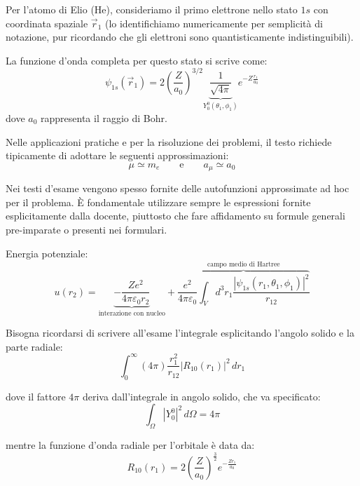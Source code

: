 \begin{exercise}
    Per l'atomo di Elio (He), consideriamo il primo elettrone nello stato \( 1s \) con coordinata spaziale \( \vec{r}_1 \) (lo identifichiamo numericamente per semplicità di notazione, pur ricordando che gli elettroni sono quantisticamente indistinguibili).

    La funzione d'onda completa per questo stato si scrive come:
    \begin{equation}
        \psi_{1s}(\vec{r}_1) = 2 \left( \frac{Z}{a_0} \right)^{3/2} \underbrace{\frac{1}{\sqrt{4\pi}}}_{Y_0^0(\theta_1, \phi_1)} e^{-Z \frac{r_1}{a_0}}
    \end{equation}
    dove \( a_0 \) rappresenta il raggio di Bohr.

    Nelle applicazioni pratiche e per la risoluzione dei problemi, il testo richiede tipicamente di adottare le seguenti approssimazioni:
    \begin{equation}
        \mu \simeq m_e \qquad \text{e} \qquad a_\mu \simeq a_0
    \end{equation}

    \begin{attention}
        Nei testi d'esame vengono spesso fornite delle autofunzioni approssimate ad hoc per il problema. È fondamentale utilizzare sempre le espressioni fornite esplicitamente dalla docente, piuttosto che fare affidamento su formule generali pre-imparate o presenti nei formulari.
    \end{attention}
Energia potenziale:
\begin{equation}
    u(r_2) = \underbrace{-\frac{Z e^2}{4\pi\varepsilon_0 r_2}}_{\text{interazione con nucleo}} + \overbrace{\frac{e^2}{4\pi\varepsilon_0} \int_V d^3r_1 \frac{|\psi_{1s}(r_1, \theta_1, \phi_1)|^2}{r_{12}}}^{\text{campo medio di Hartree}}
\end{equation}

Bisogna ricordarsi di scrivere all'esame l'integrale esplicitando l'angolo solido e la parte radiale:
\begin{equation}
    \int_0^\infty (4\pi) \frac{r_1^2}{r_{12}} |R_{10}(r_1)|^2 \, dr_1
\end{equation}

dove il fattore \( 4\pi \) deriva dall'integrale in angolo solido, che va specificato:
\begin{equation}
    \int_\Omega |Y_0^0|^2 \, d\Omega = 4\pi
\end{equation}

mentre la funzione d'onda radiale per l'orbitale è data da:
\begin{equation}
    R_{10}(r_1) = 2 \left( \frac{Z}{a_0} \right)^{\frac{3}{2}} e^{-\frac{Z r_1}{a_0}}
\end{equation}


\end{exercise}
